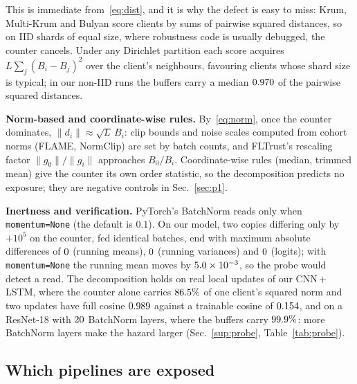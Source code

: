 \documentclass[journal]{IEEEtran}
\begin{document}
This is immediate from~\eqref{eq:dist}, and it is why the defect is easy to miss:
Krum, Multi-Krum and Bulyan score clients by sums of pairwise squared distances, so
on IID shards of equal size, where robustness code is usually debugged, the counter
cancels. Under any Dirichlet partition each score acquires
$L\sum_j (B_i-B_j)^2$ over the client's neighbours, favouring clients whose shard
size is typical; in our non-IID runs the buffers carry a median
$0.970$ of the pairwise squared distances.

\textbf{Norm-based and coordinate-wise rules.} By~\eqref{eq:norm}, once the counter
dominates, $\|d_i\|\approx\sqrt{L}\,B_i$: clip bounds and noise scales computed from
cohort norms (FLAME, NormClip) are set by batch counts, and FLTrust's rescaling
factor $\|g_0\|/\|g_i\|$ approaches $B_0/B_i$. Coordinate-wise rules (median,
trimmed mean) give the counter its own order statistic, so the decomposition
predicts no exposure; they are negative controls in Sec.~\ref{sec:p1}.

\textbf{Inertness and verification.} PyTorch's BatchNorm reads \nbt{} only when
\texttt{momentum=None} (the default is $0.1$). On our model, two copies
differing only by $+10^5$ on the counter, fed identical batches, end with maximum
absolute differences of $0$ (running means), $0$ (running
variances) and $0$ (logits); with \texttt{momentum=None} the running mean
moves by $5.0\times10^{-3}$, so the probe would detect a read. The decomposition holds on real local updates of our CNN\,+\,LSTM, where
the counter alone carries $86.5\%$ of one client's squared norm and two
updates have full cosine $0.989$ against a trainable cosine of
$0.154$, and on a ResNet-18 with $20$ BatchNorm layers, where the
buffers carry $99.9\%$: more BatchNorm layers make the hazard larger
(Sec.~\ref{sup:probe}, Table~\ref{tab:probe}).

\subsection{Which pipelines are exposed}
\label{sec:scope}
\end{document}
